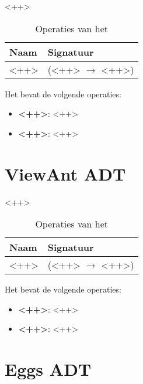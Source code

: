 <++>

\begin{table}[hbt]
\centering
\begin{tabular}{|ll|}
\hline
\rowcolor[HTML]{000000} 
{\color[HTML]{FFFFFF} \textbf{Naam}} & {\color[HTML]{FFFFFF} \textbf{Signatuur}} \\ \hline
<++>                                 & (<++> $\rightarrow$ <++>)                                       \\ \hline
\end{tabular}
\caption{Operaties van het \texttt{}}
\label{table:ant}
\end{table}

Het \texttt{} bevat de volgende operaties:

\begin{itemize}
	\item \textbf{<++>}: <++>
	\item \textbf{<++>}: <++>
\end{itemize}

\section{View\textunderscore Ant ADT}
\label{section:view_ant}

<++>

\begin{table}[hbt]
\centering
\begin{tabular}{|ll|}
\hline
\rowcolor[HTML]{000000} 
{\color[HTML]{FFFFFF} \textbf{Naam}} & {\color[HTML]{FFFFFF} \textbf{Signatuur}} \\ \hline
<++>                                 & (<++> $\rightarrow$ <++>)                                       \\ \hline
\end{tabular}
\caption{Operaties van het \texttt{}}
\label{table:view_ant}
\end{table}

Het \texttt{} bevat de volgende operaties:

\begin{itemize}
	\item \textbf{<++>}: <++>
	\item \textbf{<++>}: <++>
\end{itemize}

\section{Eggs ADT}
\label{section:eggs}

